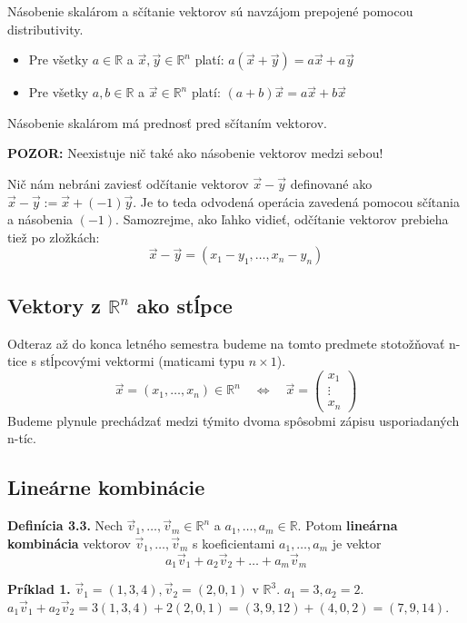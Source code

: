 \documentclass[11pt]{article}
\renewcommand{\vec}[1]{\overrightarrow{#1}}
\newcommand{\R}{\mathbb{R}}
\begin{document}
\hrulefill

Násobenie skalárom a sčítanie vektorov sú navzájom prepojené pomocou distributivity.
\begin{itemize}
    \item Pre všetky $a \in \R$ a $\vec{x}, \vec{y} \in \R^n$ platí: $a(\vec{x}+\vec{y}) = a\vec{x} + a\vec{y}$
    \item Pre všetky $a,b \in \R$ a $\vec{x} \in \R^n$ platí: $(a+b)\vec{x} = a\vec{x} + b\vec{x}$
\end{itemize}
Násobenie skalárom má prednosť pred sčítaním vektorov.

\noindent\textbf{POZOR:} Neexistuje nič také ako násobenie vektorov medzi sebou!

Nič nám nebráni zaviesť odčítanie vektorov $\vec{x}-\vec{y}$ definované ako $\vec{x}-\vec{y} := \vec{x} + (-1)\vec{y}$. Je to teda odvodená operácia zavedená pomocou sčítania a násobenia $(-1)$. Samozrejme, ako ľahko vidieť, odčítanie vektorov prebieha tiež po zložkách:
$$ \vec{x}-\vec{y} = (x_1-y_1, \dots, x_n-y_n) $$

\hrulefill

\subsection{Vektory z $\R^n$ ako stĺpce}
Odteraz až do konca letného semestra budeme na tomto predmete stotožňovať n-tice s stĺpcovými vektormi (maticami typu $n \times 1$).
$$ \vec{x} = (x_1, \dots, x_n) \in \R^n \quad \iff \quad \vec{x} = \begin{pmatrix} x_1 \\ \vdots \\ x_n \end{pmatrix} $$
Budeme plynule prechádzať medzi týmito dvoma spôsobmi zápisu usporiadaných n-tíc.

\hrulefill

\subsection{Lineárne kombinácie}
\noindent\textbf{Definícia 3.3.} Nech $\vec{v}_1, \dots, \vec{v}_m \in \R^n$ a $a_1, \dots, a_m \in \R$.
Potom \textbf{lineárna kombinácia} vektorov $\vec{v}_1, \dots, \vec{v}_m$ s koeficientami $a_1, \dots, a_m$ je vektor
$$ a_1\vec{v}_1 + a_2\vec{v}_2 + \dots + a_m\vec{v}_m $$

\vspace{1em}
\noindent\textbf{Príklad 1.}
$\vec{v}_1 = (1,3,4), \vec{v}_2 = (2,0,1)$ v $\R^3$.
$a_1 = 3, a_2 = 2$.
$a_1\vec{v}_1 + a_2\vec{v}_2 = 3(1,3,4) + 2(2,0,1) = (3,9,12) + (4,0,2) = (7,9,14)$.
\end{document}
